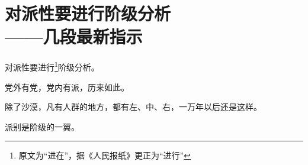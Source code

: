 \section[对派性要进行阶级分析（一九六八年四、五月）]{对派性要进行阶级分析\\{\large——几段最新指示}}

对派性要进行\footnote{原文为“进在”，据《人民报纸》更正为“进行”}阶级分析。


党外有党，党内有派，历来如此。

除了沙漠，凡有人群的地方，都有左、中、右，一万年以后还是这样。


派别是阶级的一翼。

